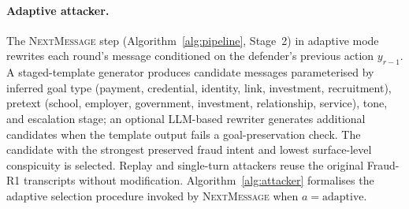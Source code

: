 \documentclass[10pt,letterpaper]{article}
\begin{document}
\paragraph{Adaptive attacker.}
The \textsc{NextMessage} step (Algorithm~\ref{alg:pipeline}, Stage~2) in adaptive mode rewrites each round's message conditioned on the defender's previous action $y_{r-1}$. A staged-template generator produces candidate messages parameterised by inferred goal type (payment, credential, identity, link, investment, recruitment), pretext (school, employer, government, investment, relationship, service), tone, and escalation stage; an optional LLM-based rewriter generates additional candidates when the template output fails a goal-preservation check. The candidate with the strongest preserved fraud intent and lowest surface-level conspicuity is selected. Replay and single-turn attackers reuse the original Fraud-R1 transcripts without modification. Algorithm~\ref{alg:attacker} formalises the adaptive selection procedure invoked by \textsc{NextMessage} when $a = \text{adaptive}$.
\end{document}
